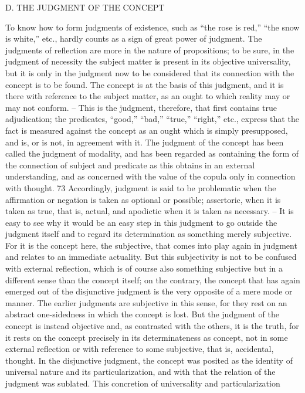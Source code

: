 D. THE JUDGMENT OF THE CONCEPT

To know how to form judgments of existence, such as “the rose is red,” “the
snow is white,” etc., hardly counts as a sign of great power of judgment.
The judgments of reflection are more in the nature of propositions; to be sure,
in the judgment of necessity the subject matter is present in its objective
universality, but it is only in the judgment now to be considered that its
connection with the concept is to be found. The concept is at the basis of this
judgment, and it is there with reference to the subject matter, as an ought to
which reality may or may not conform. – This is the judgment, therefore,
that first contains true adjudication; the predicates, “good,” “bad,” “true,”
“right,” etc., express that the fact is measured against the concept as an
ought which is simply presupposed, and is, or is not, in agreement with it.
The judgment of the concept has been called the judgment of modality,
and has been regarded as containing the form of the connection of subject
and predicate as this obtains in an external understanding, and as concerned
with the value of the copula only in connection with thought. 73 Accordingly,
judgment is said to be problematic when the affirmation or negation is
taken as optional or possible; assertoric, when it is taken as true, that is,
actual, and apodictic when it is taken as necessary. – It is easy to see why it
would be an easy step in this judgment to go outside the judgment itself
and to regard its determination as something merely subjective. For it is the
concept here, the subjective, that comes into play again in judgment and
relates to an immediate actuality. But this subjectivity is not to be confused
with external reflection, which is of course also something subjective but in
a different sense than the concept itself; on the contrary, the concept that
has again emerged out of the disjunctive judgment is the very opposite of
a mere mode or manner. The earlier judgments are subjective in this sense,
for they rest on an abstract one-sidedness in which the concept is lost.
But the judgment of the concept is instead objective and, as contrasted
with the others, it is the truth, for it rests on the concept precisely in its
determinateness as concept, not in some external reflection or with reference
to some subjective, that is, accidental, thought.
In the disjunctive judgment, the concept was posited as the identity of
universal nature and its particularization, and with that the relation of the
judgment was sublated. This concretion of universality and particularization
